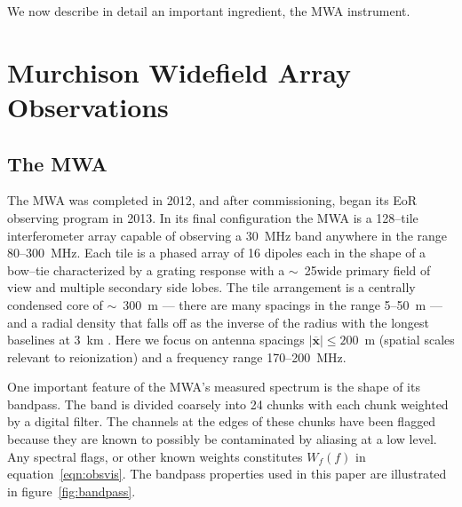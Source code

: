 \documentclass[preprint2,iop,numberedappendix]{emulateapj}
\begin{document}
We now describe in detail an important ingredient, the MWA instrument.

\section{Murchison Widefield Array Observations}\label{sec:instrument}

\subsection{The MWA}

The MWA was completed in 2012, and after commissioning, began its EoR observing program in 2013. In its final configuration the MWA is a 128--tile interferometer array capable of observing a 30~MHz band anywhere in the range 80--300~MHz.  Each tile is a phased array of 16 dipoles each in the shape of a bow--tie characterized by a grating response with a $\sim$~25\arcdeg wide primary field of view and multiple secondary side lobes. The tile arrangement is a centrally condensed core of $\sim$~300~m --- there are many spacings in the range 5--50~m --- and a radial density that falls off as the inverse of the radius with the longest baselines at 3~km \citep{bea12}. Here we focus on antenna spacings $|\overline{\mathbf{x}}| \le 200$~m (spatial scales relevant to reionization) and a frequency range 170--200~MHz.

One important feature of the MWA's measured spectrum is the shape of its bandpass. The band is divided coarsely into 24 chunks with each chunk weighted by a digital filter. The channels at the edges of these chunks have been flagged because they are known to possibly be contaminated by aliasing at a low level. Any spectral flags, or other known weights constitutes $W_f(f)$ in equation~\ref{eqn:obsvis}. The bandpass properties used in this paper are illustrated in figure~\ref{fig:bandpass}. 
\end{document}
